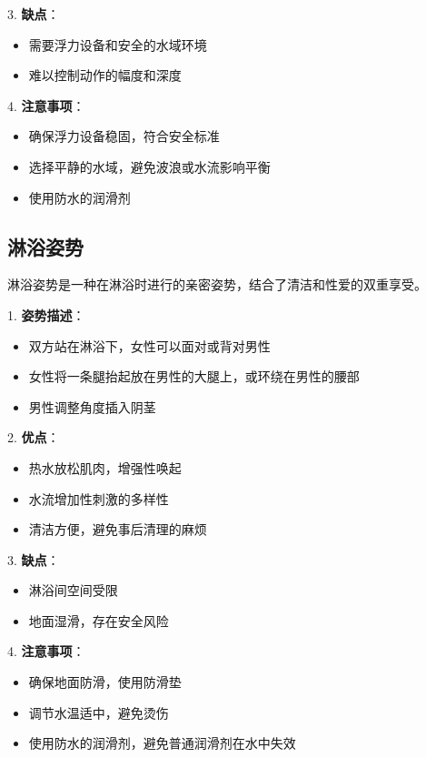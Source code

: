 \documentclass[12pt,UTF8]{ctexbook}
\begin{document}
3. \textbf{缺点}：
  \begin{itemize}
  \item 需要浮力设备和安全的水域环境
  \item 难以控制动作的幅度和深度
  \end{itemize}

4. \textbf{注意事项}：
  \begin{itemize}
  \item 确保浮力设备稳固，符合安全标准
  \item 选择平静的水域，避免波浪或水流影响平衡
  \item 使用防水的润滑剂
  \end{itemize}

\subsection{淋浴姿势}

淋浴姿势是一种在淋浴时进行的亲密姿势，结合了清洁和性爱的双重享受。

1. \textbf{姿势描述}：
  \begin{itemize}
  \item 双方站在淋浴下，女性可以面对或背对男性
  \item 女性将一条腿抬起放在男性的大腿上，或环绕在男性的腰部
  \item 男性调整角度插入阴茎
  \end{itemize}

2. \textbf{优点}：
  \begin{itemize}
  \item 热水放松肌肉，增强性唤起
  \item 水流增加性刺激的多样性
  \item 清洁方便，避免事后清理的麻烦
  \end{itemize}

3. \textbf{缺点}：
  \begin{itemize}
  \item 淋浴间空间受限
  \item 地面湿滑，存在安全风险
  \end{itemize}

4. \textbf{注意事项}：
  \begin{itemize}
  \item 确保地面防滑，使用防滑垫
  \item 调节水温适中，避免烫伤
  \item 使用防水的润滑剂，避免普通润滑剂在水中失效
  \end{itemize}
\end{document}
